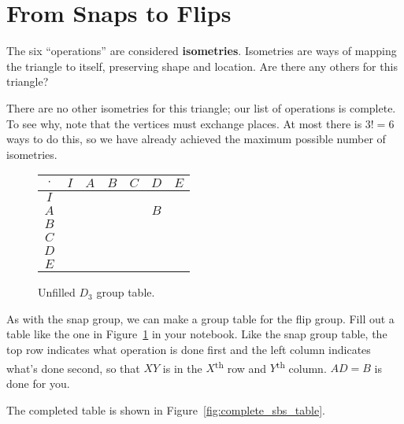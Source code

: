 \documentclass[../gatm_answers.tex]{subfiles}
\begin{document}
\section{From Snaps to Flips}

\begin{outer_problem}[start=1]
\item The six ``operations'' are considered \textbf{isometries}. Isometries are ways of mapping the triangle to itself, preserving shape and location. Are there any others for this triangle?
\end{outer_problem}

There are no other isometries for this triangle; our list of operations is complete. To see why, note that the vertices must exchange places. At most there is $3!=6$ ways to do this, so we have already achieved the maximum possible number of isometries.

\begin{figure}[h]
\centering
\begin{tabular}{c|c|c|c|c|c|c|}
$\cdot$ & $I$ & $A$ & $B$ & $C$ & $D$ & $E$ \\ \hline
$I$    &   &   &   &   &   &   \\ \hline
$A$    &   &   &   &   & $B$  &   \\ \hline
$B$    &   &   &   &   &   &   \\ \hline
$C$    &   &   &   &   &   &   \\ \hline
$D$    &   &   &   &   &   &   \\ \hline
$E$    &   &   &   &   &   &   \\ \hline
\end{tabular}
\caption{Unfilled $D_3$ group table.}
\label{fig:sbstable}
\end{figure}

\begin{outer_problem}
\item As with the snap group, we can make a group table for the flip group. Fill out a table like the one in Figure~\ref{fig:sbstable} in your notebook. Like the snap group table, the top row indicates what operation is done first and the left column indicates what's done second, so that $XY$ is in the $X$\textsuperscript{th} row and $Y$\textsuperscript{th} column. $AD=B$ is done for you.
\end{outer_problem}

The completed table is shown in Figure~\ref{fig:complete_sbs_table}.
\end{document}
